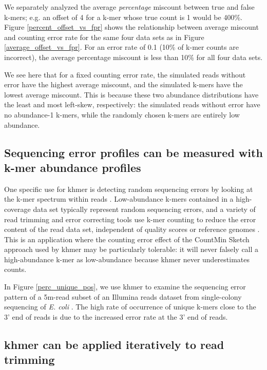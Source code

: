 \documentclass{article}
\begin{document}
We separately analyzed the average {\em percentage} miscount between
true and false k-mers; e.g. an offset of 4 for a k-mer whose true
count is 1 would be 400\%.  Figure \ref{percent_offset_vs_fpr} shows the relationship between average 
miscount and counting error rate for the same four data sets as in Figure \ref{average_offset_vs_fpr}.  For an error rate of 0.1 (10\% of k-mer counts are incorrect), the average percentage miscount is less than 10\% for all four data sets.

We see here that for a fixed counting error rate, the simulated reads
without error have the highest average miscount, and the simulated
k-mers have the lowest average miscount.  This is because these two
abundance distributions have the least and most left-skew,
respectively: the simulated reads without error have no abundance-1
k-mers, while the randomly chosen k-mers are entirely low abundance.

\subsection{Sequencing error profiles can be measured with k-mer abundance
profiles}

One specific use for khmer is detecting random sequencing errors by
looking at the k-mer spectrum within reads \cite{Medvedev2011}.
Low-abundance k-mers contained in a high-coverage data set typically
represent random sequencing errors, and a variety of read trimming and
error correcting tools use k-mer counting to reduce the error content
of the read data set, independent of quality scores or reference
genomes \cite{Kelley2010}.  This is an application where the counting
error effect of the CountMin Sketch approach used by khmer may be
particularly tolerable: it will never falsely call a high-abundance k-mer as low-abundance because khmer never underestimates counts.


In Figure \ref{perc_unique_pos}, we use khmer to examine the
sequencing error pattern of a 5m-read subset of an Illumina reads
dataset from single-colony sequencing of {\em E. coli}
\cite{pubmed21926975}.  The high rate of occurrence of unique k-mers
close to the 3' end of reads is due to the increased error rate at the
3' end of reads.

\subsection{khmer can be applied iteratively to read trimming}
\end{document}
